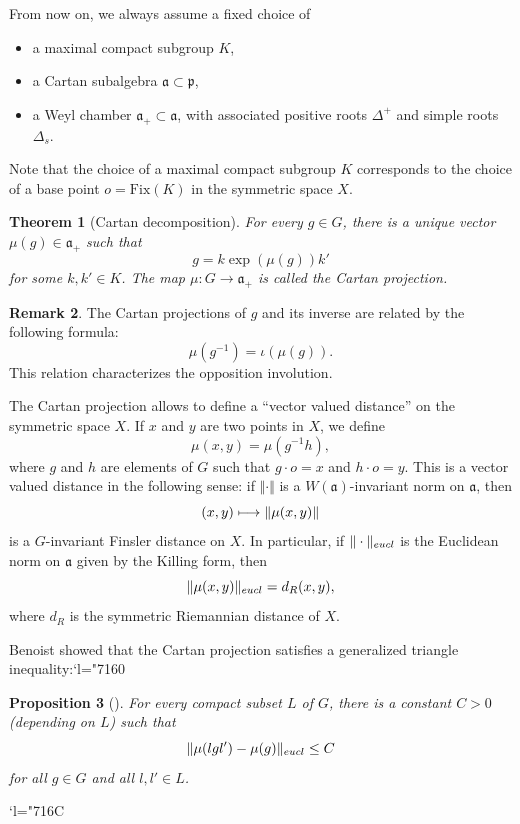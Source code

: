 \documentclass[11pt]{article}
\numberwithin{equation}{section}
\newcommand\mto{\mathchoice{\longmapsto}{\mapsto}{\mapsto}{\mapsto}}
\newcommand{\Changel}{\mathcode`l="7160}
\newcommand{\Changelback}{\mathcode`l="716C}
\newtheorem{theo}{Theorem}[section]
\newtheorem{prop}[theo]{Proposition}
\theoremstyle{definition}
\newtheorem{rmk}[theo]{Remark}
\newcommand{\fa}{\mathfrak{a}}
\newcommand{\fp}{\mathfrak{p}}
\newcommand{\norm}[1]{\Vert #1 \Vert}
\let\op\iota
\begin{document}
From now on, we always assume a fixed choice of
\begin{itemize}
\item a maximal compact subgroup $K$,
\item a Cartan subalgebra $\fa \subset \fp$,
\item a Weyl chamber $\fa_+ \subset \fa$, with associated positive roots $\Delta^+$ and simple roots $\Delta_s$.
\end{itemize}
Note that the choice of a maximal compact subgroup $K$ corresponds to the choice of a base point $o = \mathrm{Fix}(K)$ in the symmetric space $X$.

\begin{theo}[Cartan decomposition]
For every $g\in G$, there is a unique vector $\mu(g) \in \fa_+$ such that
\[g = k \exp(\mu(g)) k'\]
for some $k,k'\in K$. The map $\mu: G \to \fa_+$ is called the \emph{Cartan projection}.
\end{theo}

\begin{rmk}
The Cartan projections of $g$ and its inverse are related by the following formula:
\[\mu(g^{-1}) = \op(\mu(g)).\]
This relation characterizes the opposition involution.
\end{rmk}

The Cartan projection allows to define a ``vector valued distance'' on the symmetric space $X$. If $x$ and $y$ are two points in $X$, we define
\[\mu(x,y) = \mu(g^{-1}h),\]
where $g$ and $h$ are elements of $G$ such that $g\cdot o = x$ and $h\cdot o = y$. This is a vector valued distance in the following sense: if $\norm{\cdot}$ is a $W(\fa)$-invariant norm on $\fa$, then
\[(x,y) \mto \norm{\mu(x,y)}\]
is a $G$-invariant Finsler distance on $X$. In particular, if $\norm{\cdot}_{\textup{eucl}}$ is the Euclidean norm on $\fa$ given by the Killing form, then
\[\norm{\mu(x,y)}_{\textup{eucl}} = d_R(x,y),\]
where $d_R$ is the symmetric Riemannian distance of $X$.

Benoist showed that the Cartan projection satisfies a generalized triangle inequality:\Changel

\begin{prop}[\cite{benoist1997proprietes}]\label{prop - Benoist cartan projection continuous}
For every compact subset $L$ of $G$, there is a constant $C>0$ (depending on $L$) such that
\[\norm{\mu(lgl') - \mu(g)}_{\textup{eucl}} \leq C\]
for all $g\in G$ and all $l,l'\in L$.
\end{prop}

\Changelback
\end{document}
